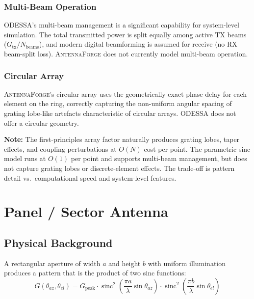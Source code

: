 \documentclass[11pt,a4paper]{article}
\newcommand{\AF}{\textsc{AntennaForge}}
\newcommand{\OD}{\textsc{ODESSA}}
\newcommand{\sinc}{\operatorname{sinc}}
\newcommand{\caveat}[1]{\par\noindent\colorbox{highlightyellow}{\parbox{\dimexpr\linewidth-2\fboxsep\relax}{\textbf{Note:} #1}}\par\medskip}
\begin{document}
\subsubsection{Multi-Beam Operation}

\OD{}'s multi-beam management is a significant capability for system-level
simulation.  The total transmitted power is split equally among active TX beams
($G_{\text{tx}}/N_{\text{beams}}$), and modern digital beamforming is assumed
for receive (no RX beam-split loss).  \AF{} does not currently model
multi-beam operation.

\subsubsection{Circular Array}

\AF{}'s circular array uses the geometrically exact phase delay for each element
on the ring, correctly capturing the non-uniform angular spacing of grating
lobe-like artefacts characteristic of circular arrays.  \OD{} does not offer a
circular geometry.

\caveat{The first-principles array factor naturally produces grating lobes,
taper effects, and coupling perturbations at $O(N)$ cost per point.  The
parametric sinc model runs at $O(1)$ per point and supports multi-beam
management, but does not capture grating lobes or discrete-element effects.
The trade-off is pattern detail vs.\ computational speed and system-level
features.}

\section{Panel / Sector Antenna}
\label{sec:panel}

\subsection{Physical Background}

A rectangular aperture of width $a$ and height $b$ with uniform illumination
produces a pattern that is the product of two sinc functions:
\begin{equation}
  G(\theta_{az}, \theta_{el}) = G_\text{peak} \cdot
    \sinc^2\!\left(\frac{\pi a}{\lambda}\sin\theta_{az}\right) \cdot
    \sinc^2\!\left(\frac{\pi b}{\lambda}\sin\theta_{el}\right)
\end{equation}
\end{document}
